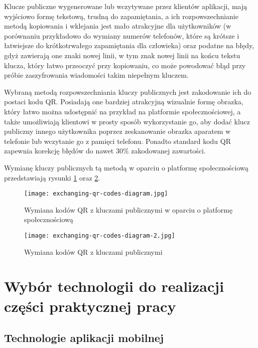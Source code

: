 \documentclass[../main.tex]{subfiles}
\begin{document}
Klucze publiczne wygenerowane lub wczytywane przez klientów aplikacji, mają wyjściowo formę tekstową, trudną do zapamiętania, a ich rozpowszechnianie metodą kopiowania i wklejania jest mało atrakcyjne dla użytkowników (w porównaniu przykładowo do wymiany numerów telefonów, które są krótsze i łatwiejsze do krótkotrwałego zapamiętania dla człowieka) oraz podatne na błędy, gdyż zawierają one znaki nowej linii, w tym znak nowej linii na końcu tekstu klucza, który łatwo przeoczyć przy kopiowaniu, co może powodować błąd przy próbie zaszyfrowania wiadomości takim niepełnym kluczem.

Wybraną metodą rozpowszechniania kluczy publicznych jest zakodowanie ich do postaci kodu QR. Posiadają one bardziej atrakcyjną wizualnie formę obrazka, który łatwo można udostępnić na przykład na platformie społecznościowej, a także umożliwiają klientowi w prosty sposób wykorzystanie go, aby dodać klucz publiczny innego użytkownika poprzez zeskanowanie obrazka aparatem w telefonie lub wczytanie go z pamięci telefonu. Ponadto standard kodu QR zapewnia korekcję błędów do nawet 30\% zakodowanej zawartości\cite{qr_code_erorr_correction}.

Wymianę kluczy publicznych tą metodą w oparciu o platformę społecznościową przedstawiają rysunki \ref{fig:qr_codes_exchange_diagram} oraz \ref{fig:qr_codes_exchange_diagram_2}.

\begin{figure}[H]
	\centering
	\texttt{[image: exchanging-qr-codes-diagram.jpg]}
	\caption{Wymiana kodów QR z kluczami publicznymi w oparciu o platformę społecznościową\cite{sdex_publikacja_2016}}
	\label{fig:qr_codes_exchange_diagram}
\end{figure}
\vfill

\begin{figure}[H]
	\centering
	\texttt{[image: exchanging-qr-codes-diagram-2.jpg]}
	\caption{Wymiana kodów QR z kluczami publicznymi}
	\label{fig:qr_codes_exchange_diagram_2}
\end{figure}

\section{Wybór technologii do realizacji części praktycznej pracy}\label{sec:application_technology_choices_theory}

\subsection{Technologie aplikacji mobilnej}
\end{document}
